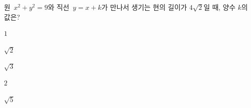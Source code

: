 원~$x^2+y^2=9$와 직선~$y=x+k$가 만나서 생기는 현의 길이가 $4\sqrt{2}$일 때, 양수 $k$의 값은?
\begin{choices32}{\rule[-3ex]{0pt}{8ex}$1$}{\rule[-3ex]{0pt}{8ex}$\sqrt{2}$}{\rule[-3ex]{0pt}{8ex}$\sqrt{3}$}{\rule[-3ex]{0pt}{8ex}$2$}{\rule[-3ex]{0pt}{8ex}$\sqrt{5}$}\end{choices32}
